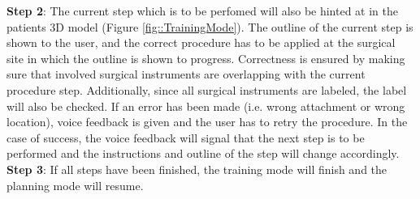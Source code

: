 \textbf{Step 2}: The current step which is to be perfomed will also be hinted at in the patients 3D model (Figure \ref{fig::TrainingMode}).
The outline of the current step is shown to the user, and the correct procedure has to be applied at the surgical site in which the outline is shown to progress.
Correctness is ensured by making sure that involved surgical instruments are overlapping with the current procedure step.
Additionally, since all surgical instruments are labeled, the label will also be checked.
If an error has been made (i.e. wrong attachment or wrong location), voice feedback is given and the user has to retry the procedure.
In the case of success, the voice feedback will signal that the next step is to be performed and the instructions and outline of the step will change accordingly.
\\
\textbf{Step 3}: If all steps have been finished, the training mode will finish and the planning mode will resume.
